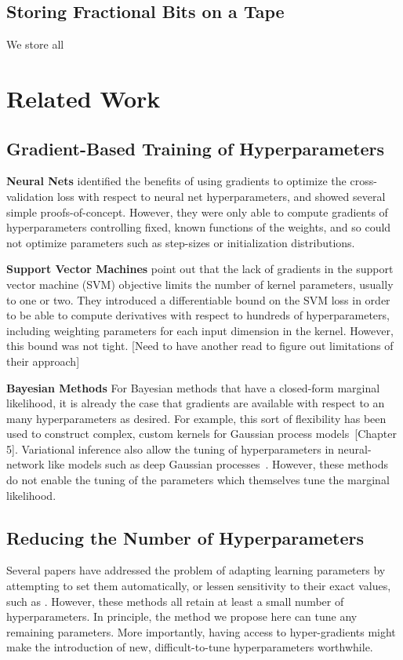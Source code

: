 \documentclass{article}
\begin{document}
\subsection{Storing Fractional Bits on a Tape}

We store all

\section{Related Work}

\subsection{Gradient-Based Training of Hyperparameters}
\textbf{Neural Nets}
\citet{bengio2000gradient, larsen1998adaptive} identified the benefits of using gradients to optimize the cross-validation loss with respect to neural net hyperparameters, and showed several simple proofs-of-concept.
However, they were only able to compute gradients of hyperparameters controlling fixed, known functions of the weights, and so could not optimize parameters such as step-sizes or initialization distributions.

\textbf{Support Vector Machines}
\citet{chapelle2002choosing} point out that the lack of gradients in the support vector machine (SVM) objective limits the number of kernel parameters, usually to one or two.
They introduced a differentiable bound on the SVM loss in order to be able to compute derivatives with respect to hundreds of hyperparameters, including weighting parameters for each input dimension in the kernel.
However, this bound was not tight. [Need to have another read to figure out limitations of their approach]

\textbf{Bayesian Methods}
For Bayesian methods that have a closed-form marginal likelihood, it is already the case that gradients are available with respect to an many hyperparameters as desired.
For example, this sort of flexibility has been used to construct complex, custom kernels for Gaussian process models~\cite{rasmussen38gaussian}[Chapter 5].
Variational inference also allow the tuning of hyperparameters in neural-network like models such as deep Gaussian processes~\citep{deepGPVar14}.
However, these methods do not enable the tuning of the parameters which themselves tune the marginal likelihood.

\subsection{Reducing the Number of Hyperparameters}
Several papers have addressed the problem of adapting learning parameters by attempting to set them automatically, or lessen sensitivity to their exact values, such as \cite{schaul2012no, Adam14, Adasecant14, Hotswap14}.
However, these methods all retain at least a small number of hyperparameters.
In principle, the method we propose here can tune any remaining parameters.
More importantly, having access to hyper-gradients might make the introduction of new, difficult-to-tune hyperparameters worthwhile.
\end{document}
